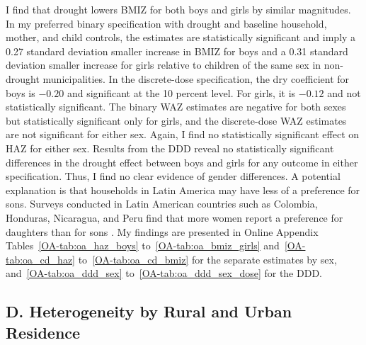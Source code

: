 \documentclass[12pt]{article}
\begin{document}
I find that drought lowers BMIZ for both boys and girls by similar magnitudes. In my preferred binary specification with drought and baseline household, mother, and child controls, the estimates are statistically significant and imply a 0.27 standard deviation smaller increase in BMIZ for boys and a 0.31 standard deviation smaller increase for girls relative to children of the same sex in non-drought municipalities. In the discrete-dose specification, the dry coefficient for boys is $-0.20$ and significant at the 10 percent level. For girls, it is $-0.12$ and not statistically significant. The binary WAZ estimates are negative for both sexes but statistically significant only for girls, and the discrete-dose WAZ estimates are not significant for either sex. Again, I find no statistically significant effect on HAZ for either sex. Results from the DDD reveal no statistically significant differences in the drought effect between boys and girls for any outcome in either specification. Thus, I find no clear evidence of gender differences. A potential explanation is that households in Latin America may have less of a preference for sons. Surveys conducted in Latin American countries such as Colombia, Honduras, Nicaragua, and Peru find that more women report a preference for daughters than for sons \parencite{fuseVariationsAttitudinalGender2010}. My findings are presented in Online Appendix Tables~\ref{OA-tab:oa_haz_boys} to~\ref{OA-tab:oa_bmiz_girls} and~\ref{OA-tab:oa_cd_haz} to~\ref{OA-tab:oa_cd_bmiz} for the separate estimates by sex, and~\ref{OA-tab:oa_ddd_sex} to~\ref{OA-tab:oa_ddd_sex_dose} for the DDD.

\subsection*{D. Heterogeneity by Rural and Urban Residence}
\end{document}
